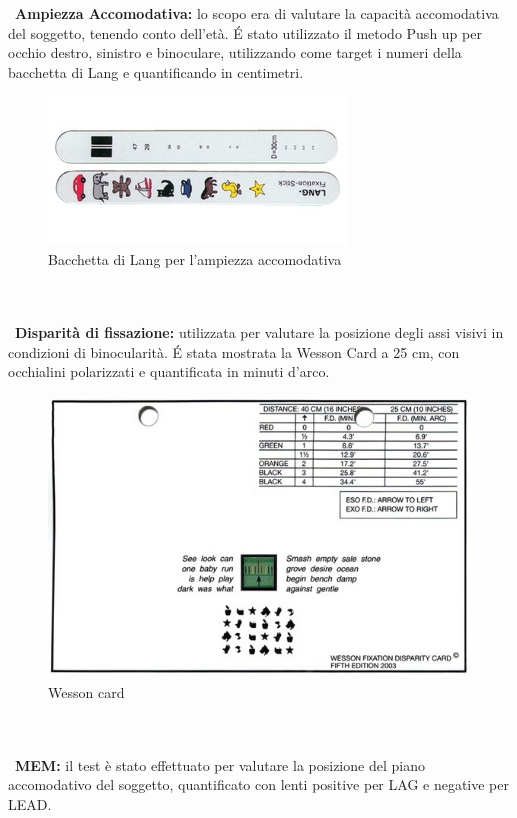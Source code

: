 \\\ \\\
\textbf{Ampiezza Accomodativa:} lo scopo era di valutare la capacità accomodativa del soggetto, tenendo conto dell’età. É stato
utilizzato il metodo Push up per occhio destro, sinistro e binoculare, utilizzando come target i numeri della bacchetta di
Lang e quantificando in centimetri.

\begin{figure}[h!]
	\centering
	\includegraphics[scale=0.5]{source/immagini/ampiezza_accomodativa.jpg}
	\caption[Semantic Web stack]{Bacchetta di Lang per l'ampiezza accomodativa}
	\label{fig:issuexample}
\end{figure}
\\\ \\\
\textbf{Disparità di fissazione:} utilizzata per valutare la posizione degli assi visivi in condizioni di binocularità. É stata mostrata
la Wesson Card a 25 cm, con occhialini polarizzati e quantificata in minuti d’arco.

\begin{figure}[h!]
	\centering
	\includegraphics[scale=0.22]{source/immagini/Wesson_card.jpg}
	\caption[Semantic Web stack]{Wesson card}
	\label{fig:issuexample}
\end{figure}
\\\ \\\
\textbf{MEM:} il test è stato effettuato per valutare la posizione del piano accomodativo del soggetto, quantificato con lenti
positive per LAG e negative per LEAD.

